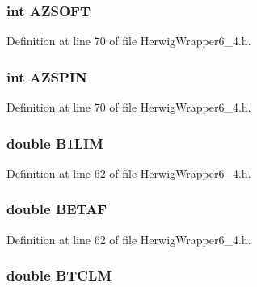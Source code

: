 \subsubsection{\setlength{\rightskip}{0pt plus 5cm}int {\bf AZSOFT}}\label{HerwigWrapper6__4_8h_7ff7d6d84f1e3c3be447b157bf3c7c86}




Definition at line 70 of file Herwig\-Wrapper6\_\-4.h.
\subsubsection{\setlength{\rightskip}{0pt plus 5cm}int {\bf AZSPIN}}\label{HerwigWrapper6__4_8h_f20740e0a6e39fb2e9934559d40150f7}




Definition at line 70 of file Herwig\-Wrapper6\_\-4.h.
\subsubsection{\setlength{\rightskip}{0pt plus 5cm}double {\bf B1LIM}}\label{HerwigWrapper6__4_8h_09b0cad1ffc70439c0c25fc2f00cc0c9}




Definition at line 62 of file Herwig\-Wrapper6\_\-4.h.
\subsubsection{\setlength{\rightskip}{0pt plus 5cm}double {\bf BETAF}}\label{HerwigWrapper6__4_8h_281156b989d1eea4051eda00c061d1e5}




Definition at line 62 of file Herwig\-Wrapper6\_\-4.h.
\subsubsection{\setlength{\rightskip}{0pt plus 5cm}double {\bf BTCLM}}\label{HerwigWrapper6__4_8h_a358887313cbeafd4cf56b1bc9596e69}




